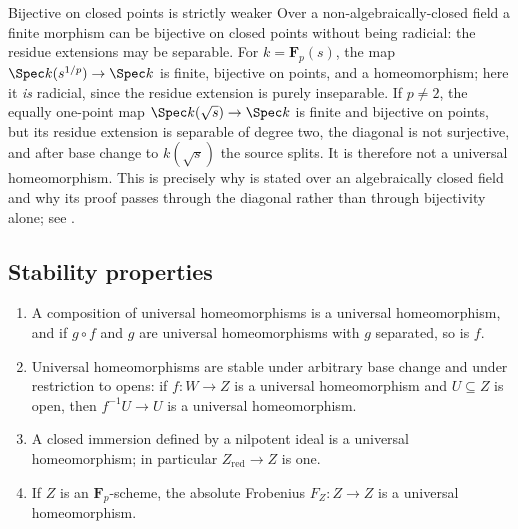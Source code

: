 \begin{warning}{Bijective on closed points is strictly weaker}
\label{warn:ch43-bijective-not-enough}
Over a non-algebraically-closed field a finite morphism can be bijective on
closed points without being radicial: the residue extensions may be
separable.  For $k=\mathbf F_p(s)$, the map
$\Spec k(s^{1/p})\to\Spec k$ is finite, bijective on points, and a
homeomorphism; here it \emph{is} radicial, since the residue extension is
purely inseparable.  If $p\ne2$, the equally one-point map
$\Spec k(\sqrt s)\to\Spec k$ is finite and bijective on points, but its
residue extension is separable of degree two, the diagonal is not
surjective, and after base change to $k(\sqrt s)$ the source splits.  It
is therefore not a universal homeomorphism.  This is precisely why
 is stated over an
algebraically closed field and why its proof passes through the diagonal
rather than through bijectivity alone; see
.
\end{warning}

\subsection{Stability properties}
\label{sec:ch43-stability}

\begin{lemma}
\label{lem:ch43-uh-stability}
\begin{enumerate}
\item\label{itm:ch43-stab:comp}
      A composition of universal homeomorphisms is a universal
      homeomorphism, and if $g\circ f$ and $g$ are universal
      homeomorphisms with $g$ separated, so is $f$.
\item\label{itm:ch43-stab:bc}
      Universal homeomorphisms are stable under arbitrary base change and
      under restriction to opens: if $f:W\to Z$ is a universal
      homeomorphism and $U\subseteq Z$ is open, then
      $f^{-1}U\to U$ is a universal homeomorphism.
\item\label{itm:ch43-stab:red}
      A closed immersion defined by a nilpotent ideal is a universal
      homeomorphism; in particular $Z_{\mathrm{red}}\to Z$ is one.
\item\label{itm:ch43-stab:frob}
      If $Z$ is an $\mathbf F_p$-scheme, the absolute Frobenius
      $F_Z:Z\to Z$ is a universal homeomorphism.
\end{enumerate}
\end{lemma}


